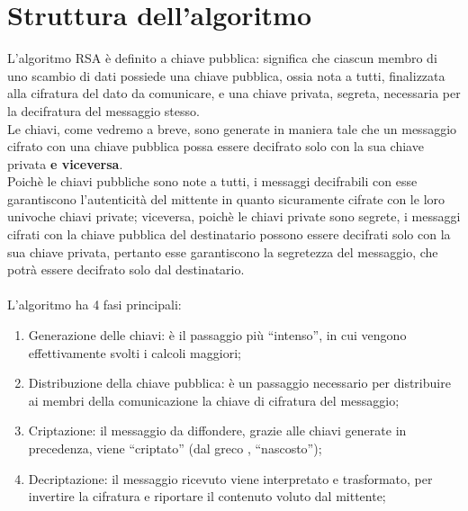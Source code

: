 \documentclass[a4paper,12pt]{article}
\begin{document}
\newpage
\section{Struttura dell'algoritmo}
L'algoritmo RSA è definito a chiave pubblica: significa che ciascun membro di uno scambio di dati possiede una chiave pubblica, ossia nota a tutti, finalizzata alla cifratura del dato da comunicare, e una chiave privata, segreta, necessaria per la decifratura del messaggio stesso.\\
Le chiavi, come vedremo a breve, sono generate in maniera tale che un messaggio cifrato con una chiave pubblica possa essere decifrato solo con la sua chiave privata \textbf{e viceversa}.\\
Poichè le chiavi pubbliche sono note a tutti, i messaggi decifrabili con esse garantiscono l'autenticità del mittente in quanto sicuramente cifrate con le loro univoche chiavi private; viceversa, poichè le chiavi private sono segrete, i messaggi cifrati con la chiave pubblica del destinatario possono essere decifrati solo con la sua chiave privata, pertanto esse garantiscono la segretezza del messaggio, che potrà essere decifrato solo dal destinatario.\\\\
L'algoritmo ha 4 fasi principali:
\begin{enumerate}
    \item Generazione delle chiavi: è il passaggio più ``intenso'', in cui vengono effettivamente svolti i calcoli maggiori;
    \item Distribuzione della chiave pubblica: è un passaggio necessario per distribuire ai membri della comunicazione la chiave di cifratura del messaggio;
    \item Criptazione: il messaggio da diffondere, grazie alle chiavi generate in precedenza, viene ``criptato'' (dal greco \textkappa \textrho \textupsilon \textpi \texttau \textomikron \textvarsigma, ``nascosto'');
    \item Decriptazione: il messaggio ricevuto viene interpretato e trasformato, per invertire la cifratura e riportare il contenuto voluto dal mittente;
\end{enumerate}
\end{document}
